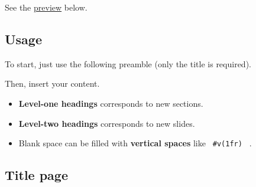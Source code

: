 See the
\href{https://github.com/typst/packages/raw/main/packages/preview/slydst/0.1.3/\#example}{preview}
below.

\subsection{Usage}\label{usage}

To start, just use the following preamble (only the title is required).

\begin{Shaded}
\begin{Highlighting}[]

\NormalTok{)}

\end{Highlighting}
\end{Shaded}

Then, insert your content.

\begin{itemize}
\tightlist
\item
  \textbf{Level-one headings} corresponds to new sections.
\item
  \textbf{Level-two headings} corresponds to new slides.
\item
  Blank space can be filled with \textbf{vertical spaces} like
  \texttt{\ \#v(1fr)\ } .
\end{itemize}

\begin{Shaded}
\begin{Highlighting}[]






\end{Highlighting}
\end{Shaded}

\subsection{Title page}\label{title-page}

